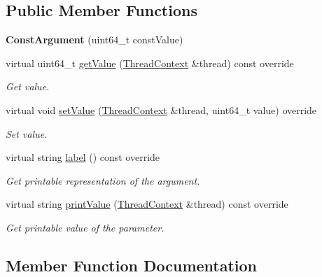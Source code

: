 \subsection*{Public Member Functions}
\begin{DoxyCompactItemize}
\item 
\mbox{\label{struct_evm_1_1_argument_1_1_const_argument_a58766ea5cf2f90482407c040b9d78d5d}} 
{\bfseries Const\+Argument} (uint64\+\_\+t const\+Value)
\item 
virtual uint64\+\_\+t \mbox{\hyperlink{struct_evm_1_1_argument_1_1_const_argument_abd4e5bb5fdad5eb9bd76436ea9c6836c}{get\+Value}} (\mbox{\hyperlink{struct_evm_1_1_thread_context}{Thread\+Context}} \&thread) const override
\begin{DoxyCompactList}\small\item\em Get value. \end{DoxyCompactList}\item 
virtual void \mbox{\hyperlink{struct_evm_1_1_argument_1_1_const_argument_ab456fa9175551b4c04815ccd65c76bd2}{set\+Value}} (\mbox{\hyperlink{struct_evm_1_1_thread_context}{Thread\+Context}} \&thread, uint64\+\_\+t value) override
\begin{DoxyCompactList}\small\item\em Set value. \end{DoxyCompactList}\item 
virtual string \mbox{\hyperlink{struct_evm_1_1_argument_1_1_const_argument_a90801800ff37e785e946f077f1c486f6}{label}} () const override
\begin{DoxyCompactList}\small\item\em Get printable representation of the argument. \end{DoxyCompactList}\item 
virtual string \mbox{\hyperlink{struct_evm_1_1_argument_1_1_const_argument_a5741f701088fadebf19b733c6973898b}{print\+Value}} (\mbox{\hyperlink{struct_evm_1_1_thread_context}{Thread\+Context}} \&thread) const override
\begin{DoxyCompactList}\small\item\em Get printable value of the parameter. \end{DoxyCompactList}\end{DoxyCompactItemize}


\subsection{Member Function Documentation}
\mbox{\label{struct_evm_1_1_argument_1_1_const_argument_abd4e5bb5fdad5eb9bd76436ea9c6836c}} 
